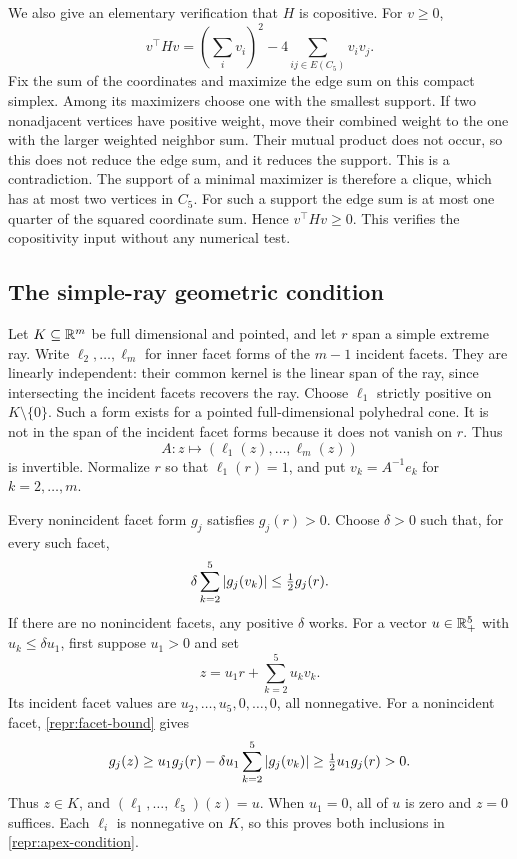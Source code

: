 We also give an elementary verification that $H$ is copositive. For $v\geq0$,
\[
 v^\top Hv=\left(\sum_i v_i\right)^2
          -4\sum_{ij\in E(C_5)}v_iv_j.
\]
Fix the sum of the coordinates and maximize the edge sum on this compact
simplex. Among its maximizers choose one with the smallest support. If two
nonadjacent vertices have positive weight, move their combined weight to
the one with the larger weighted neighbor sum. Their mutual product does
not occur, so this does not reduce the edge sum, and it reduces the support.
This is a contradiction. The support of a minimal maximizer is therefore
a clique, which has at most two vertices in $C_5$. For such a support the
edge sum is at most one quarter of the squared coordinate sum. Hence
$v^\top Hv\geq0$. This verifies the copositivity input without any numerical
test.

\subsection{The simple-ray geometric condition}
\label{repr:simple-ray-proof}

Let $K\subseteq\mathbb R^m$ be full dimensional and pointed, and let $r$ span a
simple extreme ray. Write $\ell_2,\ldots,\ell_m$ for inner facet forms of
the $m-1$ incident facets. They are linearly independent: their common
kernel is the linear span of the ray, since intersecting the incident
facets recovers the ray. Choose $\ell_1$ strictly positive on
$K\setminus\{0\}$. Such a form exists for a pointed full-dimensional
polyhedral cone. It is not in the span of the incident facet forms because
it does not vanish on $r$. Thus
\[
 A:z\longmapsto(\ell_1(z),\ldots,\ell_m(z))
\]
is invertible. Normalize $r$ so that $\ell_1(r)=1$, and put
$v_k=A^{-1}e_k$ for $k=2,\ldots,m$.

Every nonincident facet form $g_j$ satisfies $g_j(r)>0$. Choose
$\delta>0$ such that, for every such facet,
\begin{equation}\label{repr:facet-bound}
 \delta\sum_{k=2}^5\left\lvert g_j(v_k)\right\rvert\leq \tfrac12g_j(r).
\end{equation}
If there are no nonincident facets, any positive $\delta$ works. For a vector
$u\in\mathbb R_+^5$ with $u_k\leq\delta u_1$, first suppose $u_1>0$ and set
\[
 z=u_1r+\sum_{k=2}^5u_kv_k.
\]
Its incident facet values are $u_2,\ldots,u_5,0,\ldots,0$, all nonnegative.
For a nonincident facet, \eqref{repr:facet-bound} gives
\[
 g_j(z)\geq u_1g_j(r)-\delta u_1\sum_{k=2}^5\left\lvert g_j(v_k)\right\rvert
           \geq\tfrac12u_1g_j(r)>0.
\]
Thus $z\in K$, and $(\ell_1,\ldots,\ell_5)(z)=u$. When $u_1=0$, all of
$u$ is zero and $z=0$ suffices. Each $\ell_i$ is nonnegative on $K$, so this
proves both inclusions in \eqref{repr:apex-condition}.

